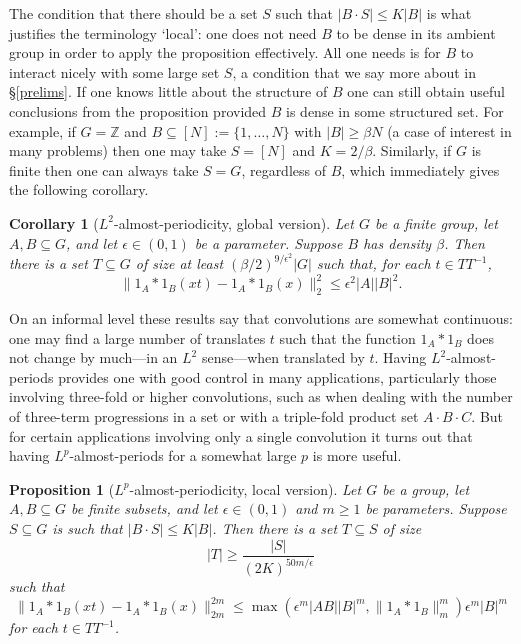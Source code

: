 \documentclass[12pt,a4paper,reqno]{amsart}
\numberwithin{equation}{section}
\theoremstyle{plain}
\newtheorem{proposition}[theorem]{Proposition}
\newtheorem{corollary}[theorem]{Corollary}
\theoremstyle{definition}
\renewcommand{\leq}{\leqslant}
\renewcommand{\geq}{\geqslant}
\renewcommand{\subset}{\subseteq}
\def\Z{\mathbb{Z}}
\providecommand{\norm}[1]{\lVert#1\rVert}
\begin{document}
The condition that there should be a set $S$ such that $|B \cdot S| \leq K|B|$ is what justifies the terminology `local': one does not need $B$ to be dense in its ambient group in order to apply the proposition effectively. All one needs is for $B$ to interact nicely with some large set $S$, a condition that we say more about in \S\ref{prelims}. If one knows little about the structure of $B$ one can still obtain useful conclusions from the proposition provided $B$ is dense in some structured set. For example, if $G = \Z$ and $B \subset [N] := \{1, \ldots, N\}$ with $|B| \geq \beta N$ (a case of interest in many problems) then one may take $S = [N]$ and $K = 2/\beta$. Similarly, if $G$ is finite then one can always take $S = G$, regardless of $B$, which immediately gives the following corollary.

\begin{corollary}[$L^2$-almost-periodicity, global version]\label{L_2-global}
Let $G$ be a finite group, let $A, B \subset G$, and let $\epsilon \in (0,1)$ be a parameter. Suppose $B$ has density $\beta$. Then there is a set $T \subset G$ of size at least $(\beta/2)^{9/\epsilon^2} |G|$ such that, for each $t \in T T^{-1}$,
\[ \norm{ 1_A*1_B(xt) - 1_A*1_B(x) }_2^2 \leq \epsilon^2 |A| |B|^2. \]
\end{corollary}

On an informal level these results say that convolutions are somewhat continuous: one may find a large number of translates $t$ such that the function $1_A*1_B$ does not change by much---in an $L^2$ sense---when translated by $t$. Having $L^2$-almost-periods provides one with good control in many applications, particularly those involving three-fold or higher convolutions, such as when dealing with the number of three-term progressions in a set or with a triple-fold product set $A\cdot B \cdot C$. But for certain applications involving only a single convolution it turns out that having $L^p$-almost-periods for a somewhat large $p$ is more useful.

\begin{proposition}[$L^p$-almost-periodicity, local version]\label{L_p-local}
Let $G$ be a group, let $A, B \subset G$ be finite subsets, and let $\epsilon \in (0,1)$ and $m \geq 1$ be parameters. Suppose $S \subset G$ is such that $|B \cdot S| \leq K|B|$. Then there is a set $T \subset S$ of size 
\[ |T| \geq \frac{|S|}{(2K)^{50m/\epsilon}} \]
such that
\[ \norm{ 1_A*1_B(xt) - 1_A*1_B(x) }_{2m}^{2m} \leq \max\left(\epsilon^m |A B| |B|^m, \norm{ 1_A*1_B }_m^m \right) \epsilon^m |B|^m \]
for each $t \in T T^{-1}$.
\end{proposition}
\end{document}
